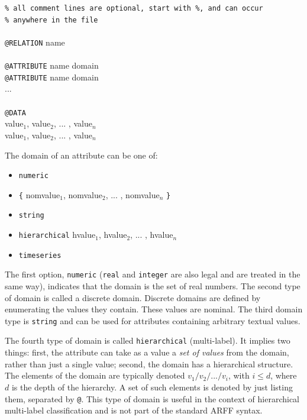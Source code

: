 \documentclass[a4paper]{report}
\begin{document}
\begin{tabbing}
{\tt \% all comment lines are optional, start with \%, and can occur }\\
{\tt \% anywhere in the file}\\
\\
{\tt @RELATION} name\\
\\
{\tt @ATTRIBUTE} name domain\\
{\tt @ATTRIBUTE} name domain\\
...\\
\\
{\tt @DATA}\\
value$_1$, value$_2$, ... , value$_n$\\
value$_1$, value$_2$, ... , value$_n$\\
\end{tabbing}

\noindent The domain of an attribute can be one of:
\begin{itemize}
	\item \texttt{numeric}
	\item \texttt{\{} nomvalue$_1$, nomvalue$_2$, ... , nomvalue$_n$ \texttt{\}}
	\item \texttt{string}
	\item \texttt{hierarchical} hvalue$_1$, hvalue$_2$, ... , hvalue$_n$
	\item \texttt{timeseries}
\end{itemize}
%
The first option, \texttt{numeric} (\texttt{real} and \texttt{integer} are also legal and are treated in the same way), indicates that the domain is the set of real numbers. The second type of domain is called a discrete domain.  Discrete domains are defined by enumerating the values they contain. These values are nominal. The third domain type is \texttt{string} and can be used for attributes containing arbitrary textual values.

The fourth type of domain is called \texttt{hierarchical} (multi-label). It implies two things: first, the attribute can take as a value a \emph{set of values} from the domain, rather than just a single value; second, the domain has a hierarchical structure.  The elements of the domain are typically denoted $v_1/v_2/.../v_i$, with $i \leq d$, where $d$ is the depth of the hierarchy.  A set of such elements is denoted by just listing them, separated by \verb^@^.  This type of domain is useful in the context of hierarchical multi-label classification and is not part of the standard ARFF syntax.  
\end{document}
